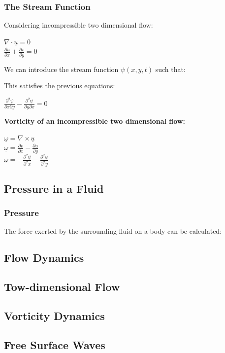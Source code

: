 \subsubsection{The Stream Function}
Considering incompressible two dimensional flow:
\begin{center}
	$\nabla \cdot \underline{u} = 0$
	\\
	$\frac{\partial u}{\partial x} + \frac{\partial v}{\partial y} = 0$	
\end{center}
We can introduce the stream function $\psi (x,y,t)$ such that:
\begin{center}
\end{center}
This satisfies the previous equations:
\begin{center}
	$\frac{\partial^2 \psi}{\partial x \partial y} - \frac{\partial^2 \psi}{\partial y \partial x} = 0$
\end{center}
\textbf{Vorticity of an incompressible two dimensional flow:}
\begin{center}
	$\underline{\omega} = \nabla \times \underline{u}$
	\\
	$\underline{\omega} = \frac{\partial v}{\partial x} - \frac{\partial u}{\partial y}$
	\\
	$\underline{\omega} = -\frac{\partial^2 \psi}{\partial^2 x} - \frac{\partial^2 \psi}{\partial^2 y}$
	\\
	\boxed{\underline{\omega}  = -\nabla^2\psi}
\end{center}

\subsection{Pressure in a Fluid}
\subsubsection{Pressure}
The force exerted by the surrounding fluid on a body can be calculated:
\subsection{Flow Dynamics}
\subsection{Tow-dimensional Flow}
\subsection{Vorticity Dynamics}
\subsection{Free Surface Waves}